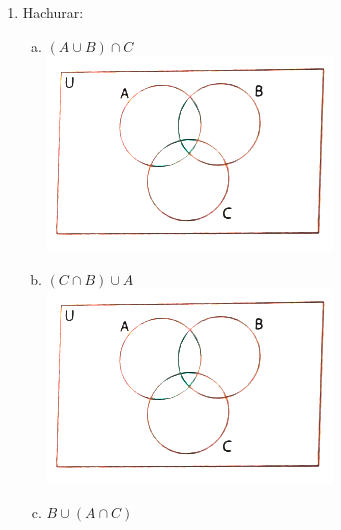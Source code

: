 \documentclass[a4paper,14pt]{article}
\begin{document}
\begin{multicols}{2}
\begin{enumerate}
\begin{enumerate}[a)]
    		\end{enumerate}
    		\item Hachurar:
    		\begin{enumerate}[a)]
    			\item $(A \cup B) \cap C$ \\
    			\includegraphics[width=1\linewidth]{imagens_6FMA91/imagem3}
    			\item $(C \cap B) \cup A$ \\
    			\includegraphics[width=1\linewidth]{imagens_6FMA91/imagem3}
    			\item $B \cup (A \cap C)$ \\

\end{enumerate}
\end{enumerate}
\end{multicols}
\end{document}
